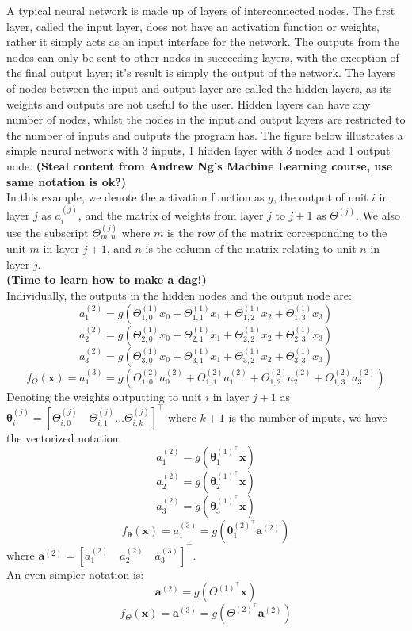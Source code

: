 \documentclass[a4paper,12pt]{article}
\numberwithin{equation}{section}
\begin{document}
A typical neural network is made up of layers of interconnected nodes. The first layer, called the input layer, does not have an activation function or weights, rather it simply acts as an input interface for the network. The outputs from the nodes can only be sent to other nodes in succeeding layers, with the exception of the final output layer; it's result is simply the output of the network. The layers of nodes between the input and output layer are called the hidden layers, as its weights and outputs are not useful to the user. Hidden layers can have any number of nodes, whilst the nodes in the input and output layers are restricted to the number of inputs and outputs the program has. The figure below illustrates a simple neural network with 3 inputs, 1 hidden layer with 3 nodes and 1 output node. \textbf{(Steal content from Andrew Ng's Machine Learning course, use same notation is ok?)}\\
In this example, we denote the activation function as $g$, the output of unit $i$ in layer $j$ as $a^{(j)}_i$, and the matrix of weights from layer $j$ to $j+1$ as $\Theta^{(j)}$. We also use the subscript $\Theta^{(j)}_{m,n}$ where $m$ is the row of the matrix corresponding to the unit $m$ in layer $j+1$, and $n$ is the column of the matrix relating to unit $n$ in layer $j$.\\
\textbf{(Time to learn how to make a dag!)}\\
Individually, the outputs in the hidden nodes and the output node are:
\[a_1^{(2)}=g(\Theta^{(1)}_{1,0}x_0+\Theta^{(1)}_{1,1}x_1+\Theta^{(1)}_{1,2}x_2+\Theta^{(1)}_{1,3}x_3)\]
\[a_2^{(2)}=g(\Theta^{(1)}_{2,0}x_0+\Theta^{(1)}_{2,1}x_1+\Theta^{(1)}_{2,2}x_2+\Theta^{(1)}_{2,3}x_3)\]
\[a_3^{(2)}=g(\Theta^{(1)}_{3,0}x_0+\Theta^{(1)}_{3,1}x_1+\Theta^{(1)}_{3,2}x_2+\Theta^{(1)}_{3,3}x_3)\]
\[f_\Theta(\bm{x})=a_1^{(3)}=g(\Theta^{(2)}_{1,0}a_0^{(2)}+\Theta^{(2)}_{1,1}a_1^{(2)}+\Theta^{(2)}_{1,2}a_2^{(2)}+\Theta^{(2)}_{1,3}a_3^{(2)})\]
Denoting the weights outputting to unit $i$ in layer $j+1$ as $\bm{\theta}^{(j)}_i = [\Theta_{i,0}^{(j)}\quad \Theta_{i,1}^{(j)}\dots \Theta_{i,k}^{(j)}]^\top$ where $k+1$ is the number of inputs, we have the vectorized notation:
\[a_1^{(2)}=g(\bm{\theta}^{(1)^\top}_1\bm{x})\]
\[a_2^{(2)}=g(\bm{\theta}^{(1)^\top}_2\bm{x})\]
\[a_3^{(2)}=g(\bm{\theta}^{(1)^\top}_3\bm{x})\]
\[f_{\bm{\theta}}(\bm{x})=a_1^{(3)}=g(\bm{\theta}_1^{(2)^\top}\bm{a}^{(2)})\] 
where $\bm{a}^{(2)}=[a_1^{(2)}\quad a_2^{(2)}\quad a_3^{(3)}]^\top$.\\
An even simpler notation is:
\[\bm{a}^{(2)}=g(\Theta^{(1)^\top}\bm{x})\]
\[f_\Theta (\bm{x})=\bm{a}^{(3)}=g(\Theta^{(2)^\top}\bm{a}^{(2)})\]
\end{document}
